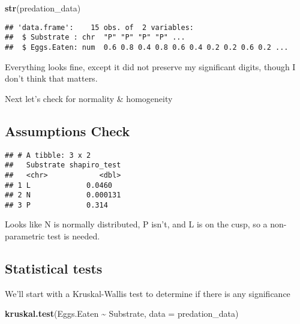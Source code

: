 \documentclass[
]{article}
\newenvironment{Shaded}{\begin{snugshade}}{\end{snugshade}}
\newcommand{\AttributeTok}[1]{\textcolor[rgb]{0.13,0.29,0.53}{#1}}
\newcommand{\FunctionTok}[1]{\textcolor[rgb]{0.13,0.29,0.53}{\textbf{#1}}}
\newcommand{\NormalTok}[1]{#1}
\newcommand{\SpecialCharTok}[1]{\textcolor[rgb]{0.81,0.36,0.00}{\textbf{#1}}}
\begin{document}
\begin{Shaded}
\begin{Highlighting}[]
\FunctionTok{str}\NormalTok{(predation\_data)}
\end{Highlighting}
\end{Shaded}

\begin{verbatim}
## 'data.frame':    15 obs. of  2 variables:
##  $ Substrate : chr  "P" "P" "P" "P" ...
##  $ Eggs.Eaten: num  0.6 0.8 0.4 0.8 0.6 0.4 0.2 0.2 0.6 0.2 ...
\end{verbatim}

Everything looks fine, except it did not preserve my significant digits,
though I don't think that matters.

Next let's check for normality \& homogeneity

\subsection{Assumptions Check}\label{assumptions-check}

\begin{Shaded}
\end{Shaded}

\begin{verbatim}
## # A tibble: 3 x 2
##   Substrate shapiro_test
##   <chr>            <dbl>
## 1 L             0.0460  
## 2 N             0.000131
## 3 P             0.314
\end{verbatim}

Looks like N is normally distributed, P isn't, and L is on the cusp, so
a non-parametric test is needed.

\subsection{Statistical tests}\label{statistical-tests}

We'll start with a Kruskal-Wallis test to determine if there is any
significance

\begin{Shaded}
\begin{Highlighting}[]
\FunctionTok{kruskal.test}\NormalTok{(Eggs.Eaten }\SpecialCharTok{\textasciitilde{}}\NormalTok{ Substrate, }\AttributeTok{data =}\NormalTok{ predation\_data)}
\end{Highlighting}
\end{Shaded}
\end{document}
